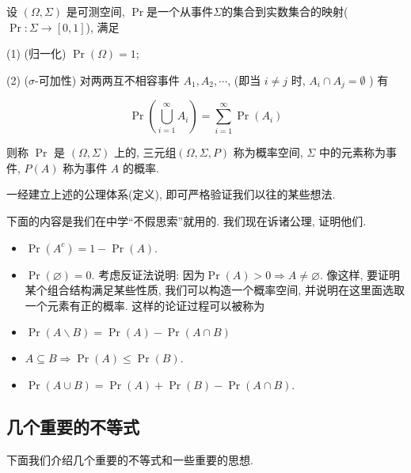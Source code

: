\documentclass{ctexart}
\begin{document}
\begin{definition}
    设 $(\Omega, \Sigma)$ 是可测空间, $\Pr$是一个从事件$\Sigma$的集合到实数集合的映射($\Pr:\Sigma\to [0,1]$), 满足

(1) (归一化) $\Pr(\Omega)=1$;


(2) ($\sigma$-可加性) 对两两互不相容事件 $A_{1}, A_{2}, \cdots$, (即当 $i \neq j$ 时, $A_{i} \cap A_{j}=\emptyset$ ) 有

$$
\Pr\left(\bigcup_{i=1}^{\infty} A_{i}\right)=\sum_{i=1}^{\infty} \Pr\left(A_{i}\right)
$$

则称 $\Pr$ 是 $(\Omega, \Sigma)$ 上的, 三元组$(\Omega, \Sigma, P)$ 称为概率空间, $\Sigma$ 中的元素称为事件, $P(A)$ 称为事件 $A$ 的概率.
\end{definition}

一经建立上述的公理体系(定义), 即可严格验证我们以往的某些想法.  

\begin{example}
    下面的内容是我们在中学``不假思索''就用的. 我们现在诉诸公理, 证明他们.

    \begin{itemize}
        \item $\operatorname{Pr}\left(A^c\right)=1-\operatorname{Pr}(A)$. 
        \item $\operatorname{Pr}(\varnothing)=0$. 考虑反证法说明: 因为$\operatorname{Pr}(A)>0 \Longrightarrow A \neq \varnothing$. 像这样, 要证明某个组合结构满足某些性质, 我们可以构造一个概率空间, 并说明在这里面选取一个元素有正的概率. 这样的论证过程可以被称为
        \item $\operatorname{Pr}(A \backslash B)=\operatorname{Pr}(A)-\operatorname{Pr}(A \cap B)$ 
        \item $A \subseteq B \Longrightarrow \operatorname{Pr}(A) \leq \operatorname{Pr}(B)$. 
        \item $\operatorname{Pr}(A \cup B)=\operatorname{Pr}(A)+\operatorname{Pr}(B)-\operatorname{Pr}(A \cap B). $
    \end{itemize}
\end{example}

\subsection{几个重要的不等式} 下面我们介绍几个重要的不等式和一些重要的思想.  
\end{document}
